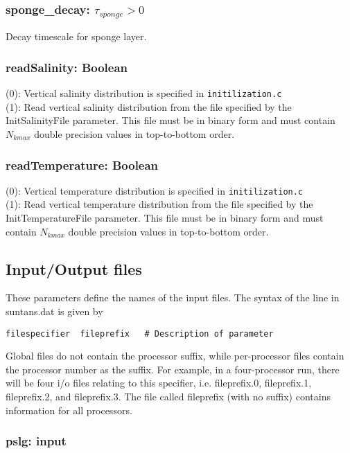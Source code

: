 \documentclass[12pt,oneside]{article}
\begin{document}
\subsubsection{sponge\_decay: $\tau_{sponge}>0$}

Decay timescale for sponge layer.

\subsubsection{readSalinity: Boolean}

(0): Vertical salinity distribution is specified in \verb+initilization.c+\\
(1): Read vertical salinity distribution from the file specified by the InitSalinityFile parameter.
This file must be in binary form and must contain $N_{kmax}$ double precision values in top-to-bottom
order.

\subsubsection{readTemperature: Boolean}

(0): Vertical temperature distribution is specified in \verb+initilization.c+\\
(1): Read vertical temperature distribution from the file specified by the InitTemperatureFile parameter.
This file must be in binary form and must contain $N_{kmax}$ double precision values in top-to-bottom
order.

\subsection{Input/Output files}

These parameters define the names of the input files.  The syntax of the line in suntans.dat is given by
\begin{verbatim}
filespecifier  fileprefix   # Description of parameter
\end{verbatim}
Global files do not contain the processor suffix, while per-processor files contain the processor
number as the suffix.
For example, in a four-processor run, there will be four i/o files relating
to this specifier, i.e. fileprefix.0, fileprefix.1, fileprefix.2, and fileprefix.3.  The file
called fileprefix (with no suffix) contains information for all processors.  

\subsubsection{pslg: input}
\end{document}

